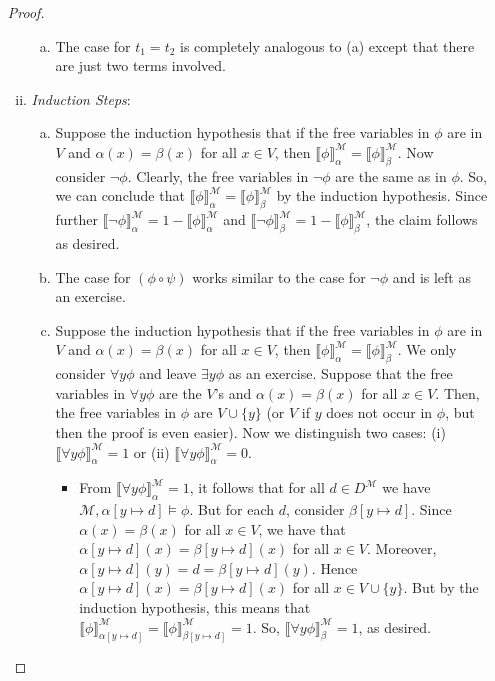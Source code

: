 \begin{enumerate}[\thesection.1]
\begin{proof}
\begin{enumerate}[(i)]
\begin{enumerate}[(a)]
								\item The case for $t_1=t_2$ is completely analogous to (a) except that there are just two terms involved.
				
			
			\end{enumerate}
			
			\item  \emph{Induction Steps}: \begin{enumerate}[(a)]
			
			\item Suppose the induction hypothesis that if the free variables in $\phi$ are in $V$ and $\alpha(x)=\beta(x)$ for all $x\in V$, then $\llbracket\phi\rrbracket_\alpha^\mathcal{M}=\llbracket\phi\rrbracket_\beta^\mathcal{M}$. Now consider $\neg\phi$. Clearly, the free variables in $\neg\phi$ are the same as in $\phi$. So, we can conclude that  $\llbracket\phi\rrbracket_\alpha^\mathcal{M}=\llbracket\phi\rrbracket_\beta^\mathcal{M}$ by the induction hypothesis. Since further $\llbracket\neg\phi\rrbracket_\alpha^\mathcal{M}=1-\llbracket\phi\rrbracket_\alpha^\mathcal{M}$ and $\llbracket\neg\phi\rrbracket_\beta^\mathcal{M}=1-\llbracket\phi\rrbracket_\beta^\mathcal{M}$, the claim follows as desired.
			
			\item The case for $(\phi\circ \psi)$ works similar to the case for $\neg\phi$ and is left as an exercise.
			
			\item Suppose the induction hypothesis that if the free variables in $\phi$ are in $V$ and $\alpha(x)=\beta(x)$ for all $x\in V$, then $\llbracket\phi\rrbracket_\alpha^\mathcal{M}=\llbracket\phi\rrbracket_\beta^\mathcal{M}$. We only consider $\forall y\phi$ and leave $\exists y\phi$ as an exercise. Suppose that the free variables in $\forall y\phi$ are the $V$'s and $\alpha(x)=\beta(x)$ for all $x\in V$. Then, the free variables in $\phi$ are $V\cup\{y\}$ (or $V$ if $y$ does not occur in $\phi$, but then the proof is even easier). Now we distinguish two cases: (i) $\llbracket\forall y\phi\rrbracket_\alpha^\mathcal{M}=1$ or (ii)  $\llbracket\forall y\phi\rrbracket_\alpha^\mathcal{M}=0$. 
			
			\begin{itemize}
			
				\item From $\llbracket\forall y\phi\rrbracket_\alpha^\mathcal{M}=1$, it follows that for all $d\in D^\mathcal{M}$ we have $\mathcal{M},\alpha[y\mapsto d]\vDash\phi$. But for each $d$, consider $\beta[y\mapsto d]$. Since $\alpha(x)=\beta(x)$ for all $x\in V$, we have that $\alpha[y\mapsto d](x)=\beta[y\mapsto d](x)$ for all $x\in V$. Moreover, $\alpha[y\mapsto d](y)=d=\beta[y\mapsto d](y)$. Hence $\alpha[y\mapsto d](x)=\beta[y\mapsto d](x)$ for all $x\in V\cup\{y\}$. But by the induction hypothesis, this means that $\llbracket\phi\rrbracket_{\alpha[y\mapsto d]}^\mathcal{M}=\llbracket\phi\rrbracket_{\beta[y\mapsto d]}^\mathcal{M}=1$. So, $\llbracket\forall y\phi\rrbracket_\beta^\mathcal{M}=1$, as desired.
				

\end{itemize}
\end{enumerate}
\end{enumerate}
\end{proof}
\end{enumerate}

